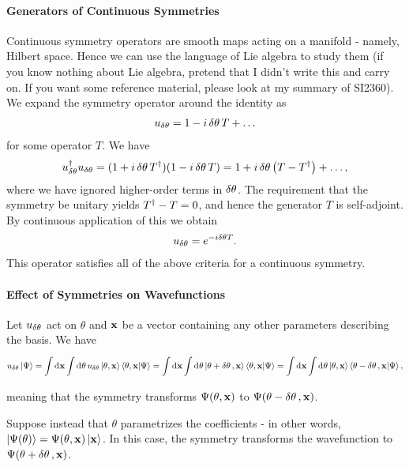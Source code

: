 \paragraph{Generators of Continuous Symmetries}
Continuous symmetry operators are smooth maps acting on a manifold - namely, Hilbert space. Hence we can use the language of Lie algebra to study them (if you know nothing about Lie algebra, pretend that I didn't write this and carry on. If you want some reference material, please look at my summary of SI2360). We expand the symmetry operator around the identity as
\begin{align*}
	u_{\var{\theta}} = 1 - i\var{\theta}T + \dots
\end{align*}
for some operator $T$. We have
\begin{align*}
	u_{\var{\theta}}^{\dagger}u_{\var{\theta}} = (1 + i\var{\theta}T^{\dagger})(1 - i\var{\theta}T) = 1 + i\var{\theta}\left(T - T^{\dagger}\right) + \dots,
\end{align*}
where we have ignored higher-order terms in $\var{\theta}$. The requirement that the symmetry be unitary yields $T^{\dagger} - T = 0$, and hence the generator $T$ is self-adjoint. By continuous application of this we obtain
\begin{align*}
	u_{\var{\theta}} = e^{-i\var{\theta}T}.
\end{align*}
This operator satisfies all of the above criteria for a continuous symmetry.

\paragraph{Effect of Symmetries on Wavefunctions}
Let $u_{\var{\theta}}$ act on $\theta$ and $\vb{x}$ be a vector containing any other parameters describing the basis. We have
\begin{align*}
	u_{\var{\theta}}\ket{\Psi} = \int\limits_{}^{}\dd[]{\vb{x}}\int\limits_{}^{}\dd[]{\theta}u_{\var{\theta}}\ket{\theta, \vb{x}}\braket{\theta, \vb{x}}{\Psi} = \int\limits_{}^{}\dd[]{\vb{x}}\int\limits_{}^{}\dd[]{\theta}\ket{\theta + \var{\theta}, \vb{x}}\braket{\theta, \vb{x}}{\Psi} = \int\limits_{}^{}\dd[]{\vb{x}}\int\limits_{}^{}\dd[]{\theta}\ket{\theta, \vb{x}}\braket{\theta - \var{\theta}, \vb{x}}{\Psi},
\end{align*}
meaning that the symmetry transforms $\Psi(\theta, \vb{x})$ to $\Psi(\theta - \var{\theta}, \vb{x})$.

Suppose instead that $\theta$ parametrizes the coefficients - in other words, $\ket{\Psi(\theta)} = \Psi(\theta, \vb{x})\ket{\vb{x}}$. In this case, the symmetry transforms the wavefunction to $\Psi(\theta + \var{\theta}, \vb{x})$.

